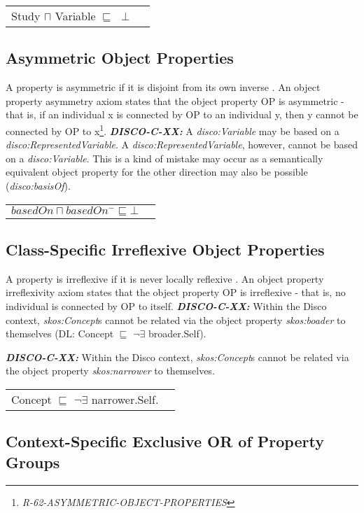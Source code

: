 \documentclass{elsart3p}    %
\newenvironment{DL}{
  \vspace{0cm}
  \begin{tabular}{l l}

}{
  \end{tabular}
}
\begin{document}
\begin{DL}
Study $\sqcap$ Variable $\sqsubseteq$ $\perp$\\
\end{DL}

\subsection{Asymmetric Object Properties}

A property is asymmetric if it is disjoint from its own inverse \cite{Kroetzsch2012}.
An object property asymmetry axiom states that the object property OP is asymmetric - that is, if an individual x is connected by OP to an individual y, then y cannot be connected by OP to x\footnote{{\em R-62-ASYMMETRIC-OBJECT-PROPERTIES}}. 
\textbf{{\em DISCO-C-XX:}} 
A {\em disco:Variable} may be based on a {\em disco:RepresentedVariable}.
A {\em disco:RepresentedVariable}, however, cannot be based on a {\em disco:Variable}.
This is a kind of mistake may occur as a semantically equivalent object property for the other direction may also be possible ({\em disco:basisOf}).

\begin{DL}
$basedOn \sqcap basedOn^{-} \sqsubseteq \bot$ 
\end{DL}

\subsection{Class-Specific Irreflexive Object Properties}

A property is irreflexive if it is never locally reflexive \cite{Kroetzsch2012}.
An object property irreflexivity axiom states that the object property OP is irreflexive - that is, no individual is connected by OP to itself. 
\textbf{{\em DISCO-C-XX:}}
Within the Disco context, {\em skos:Concept}s cannot be related via the object property {\em skos:boader} to themselves (DL: Concept $\sqsubseteq$ $\neg$$\exists$ broader.Self).

\textbf{{\em DISCO-C-XX:}}
Within the Disco context, {\em skos:Concept}s cannot be related via the object property {\em skos:narrower} to themselves. 

\begin{DL}
Concept $\sqsubseteq$ $\neg$$\exists$ narrower.Self. 
\end{DL}

\subsection{Context-Specific Exclusive OR of Property Groups}
\end{document}
